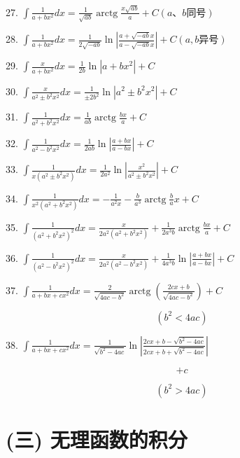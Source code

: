 \documentclass[lang=cn,newtx,10pt,scheme=chinese]{elegantbook}
\begin{document}
27. \(\int \frac{1}{a + b{x}^{2}}{dx} = \frac{1}{\sqrt{ab}}\operatorname{arctg}\frac{x\sqrt{ab}}{a} + C\left( {a\text{、}b\text{同号}}\right)\)

28. \(\int \frac{1}{a + b{x}^{2}}{dx} = \frac{1}{2\sqrt{-{ab}}}\ln \left| \frac{a + \sqrt{-{ab}}x}{a - \sqrt{-{ab}}x}\right| + C\left( {a,b\text{异号}}\right)\)

29. \(\int \frac{x}{a + b{x}^{2}}{dx} = \frac{1}{2b}\ln \left| {a + b{x}^{2}}\right| + C\)

30. \(\int \frac{x}{{a}^{2} \pm {b}^{2}{x}^{2}}{dx} = \frac{1}{\pm 2{b}^{2}}\ln \left| {{a}^{2} \pm {b}^{2}{x}^{2}}\right| + C\)

31. \(\int \frac{1}{{a}^{2} + {b}^{2}{x}^{2}}{dx} = \frac{1}{ab}\operatorname{arctg}\frac{bx}{a} + C\)

32. \(\int \frac{1}{{a}^{2} - {b}^{2}{x}^{2}}{dx} = \frac{1}{2ab}\ln \left| \frac{a + {bx}}{a - {bx}}\right| + C\)

33. \(\int \frac{1}{x\left( {{a}^{2} \pm {b}^{2}{x}^{2}}\right) }{dx} = \frac{1}{2{a}^{2}}\ln \left| \frac{{x}^{2}}{{a}^{2} \pm {b}^{2}{x}^{2}}\right| + C\)

34. \(\int \frac{1}{{x}^{2}\left( {{a}^{2} + {b}^{2}{x}^{2}}\right) }{dx} = - \frac{1}{{a}^{2}x} - \frac{b}{{a}^{3}}\operatorname{arctg}\frac{b}{a}x + C\)

35. \(\int \frac{1}{{\left( {a}^{2} + {b}^{2}{x}^{2}\right) }^{2}}{dx} = \frac{x}{2{a}^{2}\left( {{a}^{2} + {b}^{2}{x}^{2}}\right) } + \frac{1}{2{a}^{3}b}\operatorname{arctg}\frac{bx}{a} + C\)

36. \(\int \frac{1}{{\left( {a}^{2} - {b}^{2}{x}^{2}\right) }^{2}}{dx} = \frac{x}{2{a}^{2}\left( {{a}^{2} - {b}^{2}{x}^{2}}\right) } + \frac{1}{4{a}^{3}b}\ln \left| \frac{a + {bx}}{a - {bx}}\right| + C\)

37. \(\int \frac{1}{a + {bx} + c{x}^{2}}{dx} = \frac{2}{\sqrt{{4ac} - {b}^{2}}}\operatorname{arctg}\left( \frac{{2cx} + b}{\sqrt{{4ac} - {b}^{2}}}\right) + C\)

\[
\left( {{b}^{2} < {4ac}}\right)
\]

38. \(\int \frac{1}{a + {bx} + c{x}^{2}}{dx} = \frac{1}{\sqrt{{b}^{2} - {4ac}}}\ln \left| \frac{{2cx} + b - \sqrt{{b}^{2} - {4ac}}}{{2cx} + b + \sqrt{{b}^{2} - {4ac}}}\right|\)

\[
+ c
\]

\[
\left( {{b}^{2} > {4ac}}\right)
\]

\section*{(三) 无理函数的积分}
\end{document}
